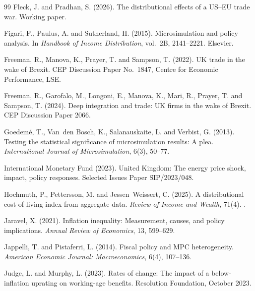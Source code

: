 \begin{thebibliography}{99}
Fleck, J. and Pradhan, S. (2026).
\newblock The distributional effects of a US--EU trade war.
\newblock Working paper.

Figari, F., Paulus, A. and Sutherland, H. (2015).
\newblock Microsimulation and policy analysis.
\newblock In \emph{Handbook of Income Distribution}, vol.\ 2B, 2141--2221. Elsevier.

Freeman, R., Manova, K., Prayer, T. and Sampson, T. (2022).
\newblock UK trade in the wake of Brexit.
\newblock CEP Discussion Paper No.~1847, Centre for Economic Performance, LSE.

Freeman, R., Garofalo, M., Longoni, E., Manova, K., Mari, R., Prayer, T. and Sampson, T. (2024).
\newblock Deep integration and trade: UK firms in the wake of Brexit.
\newblock CEP Discussion Paper 2066.

Goedem\'e, T., Van~den Bosch, K., Salanauskaite, L. and Verbist, G. (2013).
\newblock Testing the statistical significance of microsimulation results: A plea.
\newblock \emph{International Journal of Microsimulation}, 6(3), 50--77.

International Monetary Fund (2023).
\newblock United Kingdom: The energy price shock, impact, policy responses.
\newblock Selected Issues Paper SIP/2023/048.

Hochmuth, P., Pettersson, M. and Jessen~Weissert, C. (2025).
\newblock A distributional cost-of-living index from aggregate data.
\newblock \emph{Review of Income and Wealth}, 71(4). .

Jaravel, X. (2021).
\newblock Inflation inequality: Measurement, causes, and policy implications.
\newblock \emph{Annual Review of Economics}, 13, 599--629.

Jappelli, T. and Pistaferri, L. (2014).
\newblock Fiscal policy and MPC heterogeneity.
\newblock \emph{American Economic Journal: Macroeconomics}, 6(4), 107--136.

Judge, L. and Murphy, L. (2023).
\newblock Rates of change: The impact of a below-inflation uprating on working-age benefits.
\newblock Resolution Foundation, October 2023.


\end{thebibliography}
